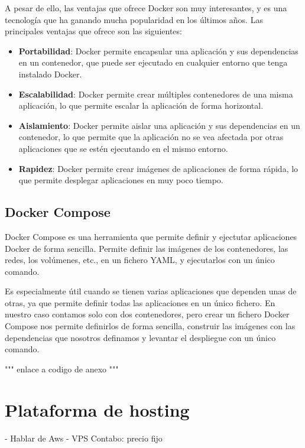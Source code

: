 A pesar de ello, las ventajas que ofrece Docker son muy interesantes, y es una tecnología que ha ganando mucha popularidad en los últimos años.
Las principales ventajas que ofrece son las siguientes:

\begin{itemize}
    \item \textbf{Portabilidad}: Docker permite encapsular una aplicación y sus dependencias en un contenedor, que puede ser ejecutado en cualquier entorno que tenga instalado Docker.
    \item \textbf{Escalabilidad}: Docker permite crear múltiples contenedores de una misma aplicación, lo que permite escalar la aplicación de forma horizontal.
    \item \textbf{Aislamiento}: Docker permite aislar una aplicación y sus dependencias en un contenedor, lo que permite que la aplicación no se vea afectada por otras aplicaciones que se estén ejecutando en el mismo entorno.
    \item \textbf{Rapidez}: Docker permite crear imágenes de aplicaciones de forma rápida, lo que permite desplegar aplicaciones en muy poco tiempo.
\end{itemize}

\subsection{Docker Compose}
Docker Compose es una herramienta que permite definir y ejectutar aplicaciones Docker de forma sencilla.
Permite definir las imágenes de los contenedores, las redes, los volúmenes, etc., en un fichero YAML, y ejecutarlos con un único comando.

Es especialmente útil cuando se tienen varias aplicaciones que dependen unas de otras, ya que permite definir todas las aplicaciones en un único fichero.
En nuestro caso contamos solo con dos contenedores, pero crear un fichero Docker Compose nos permite definirlos de forma sencilla, construir las imágenes con las dependencias que nosotros definamos y levantar el despliegue con un único comando.

""" enlace a codigo de anexo """

\section{Plataforma de hosting}
- Hablar de Aws
- VPS Contabo: precio fijo



\endinput